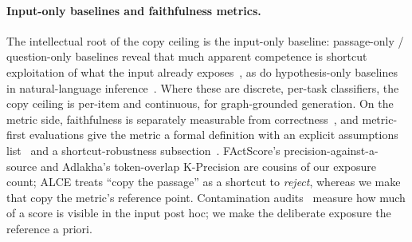 \documentclass[10pt,twocolumn]{article}
\begin{document}
\paragraph{Input-only baselines and faithfulness metrics.}
The intellectual root of the copy ceiling is the input-only baseline: passage-only / question-only
baselines reveal that much apparent competence is shortcut exploitation of what the input already
exposes~\cite{kaushik2018reading}, as do hypothesis-only baselines in natural-language
inference~\cite{gururangan2018artifacts,poliak2018hypothesis}. Where these are discrete, per-task
classifiers, the copy ceiling is per-item and continuous, for graph-grounded generation. On the
metric side, faithfulness is separately measurable from
correctness~\cite{es2023ragas,adlakha2024evaluating,zhou2023contextfaithful}, and metric-first
evaluations give the metric a formal definition with an explicit assumptions
list~\cite{min2023factscore} and a shortcut-robustness subsection~\cite{gao2023alce}. FActScore's
precision-against-a-source and Adlakha's token-overlap K-Precision are cousins of our exposure
count; ALCE treats ``copy the passage'' as a shortcut to \emph{reject}, whereas we make that copy
the metric's reference point. Contamination audits~\cite{sainz2023contamination,golchin2024timetravel}
measure how much of a score is visible in the input post hoc; we make the deliberate exposure the
reference a priori.
\end{document}
